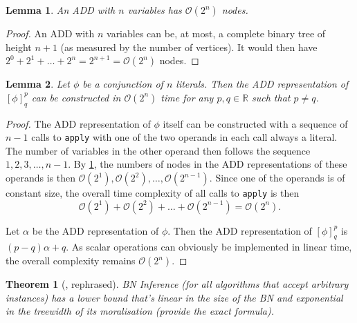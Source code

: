 \documentclass{article}
\newtheorem{theorem}{Theorem}
\newtheorem{lemma}{Lemma}
\theoremstyle{definition}
\theoremstyle{remark}
\begin{document}
\begin{lemma} \label{lemma:add_size}
  An ADD with $n$ variables has $\mathcal{O}(2^n)$ nodes.
\end{lemma}
\begin{proof}
  An ADD with $n$ variables can be, at most, a complete binary tree of height
  $n+1$ (as measured by the number of vertices). It would then have $2^0 + 2^1 +
  \dots + 2^n = 2^{n+1} = \mathcal{O}(2^n)$ nodes.
\end{proof}

\begin{lemma} \label{lemma:clause_time}
  Let $\phi$ be a conjunction of $n$ literals. Then the ADD representation of
  $[\phi]^p_q$ can be constructed in $\mathcal{O}(2^n)$ time for any $p, q \in
  \mathbb{R}$ such that $p \ne q$.
\end{lemma}
\begin{proof}
  The ADD representation of $\phi$ itself can be constructed with a sequence of
  $n-1$ calls to \texttt{apply} with one of the two operands in each call always
  a literal. The number of variables in the other operand then follows the
  sequence $1, 2, 3, \dots, n-1$. By \cref{lemma:add_size}, the numbers of nodes
  in the ADD representations of these operands is then $\mathcal{O}(2^1),
  \mathcal{O}(2^2), \dots, \mathcal{O}(2^{n-1})$. Since one of the operands is
  of constant size, the overall time complexity of all calls to \texttt{apply}
  is then
  \[
    \mathcal{O}(2^1) + \mathcal{O}(2^2) + \dots + \mathcal{O}(2^{n-1}) =
    \mathcal{O}(2^n).
  \]

  Let $\alpha$ be the ADD representation of $\phi$. Then the ADD representation
  of $[\phi]_q^p$ is $(p-q)\alpha + q$. As scalar operations can obviously be
  implemented in linear time, the overall complexity remains $\mathcal{O}(2^n)$.
\end{proof}

\begin{theorem}[\cite{DBLP:conf/ecai/KwisthoutBG10}, rephrased]
  BN Inference (for all algorithms that accept arbitrary instances) has a lower
  bound that's linear in the size of the BN and exponential in the treewidth of
  its moralisation (provide the exact formula).
\end{theorem}
\end{document}
